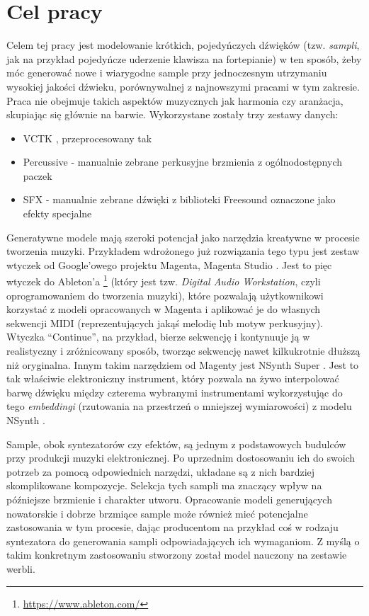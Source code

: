 \documentclass[magisterska]{pracamgr}
\renewcommand{\cite}{\citep}
\begin{document}
\section*{Cel pracy}

Celem tej pracy jest modelowanie krótkich, pojedyńczych dźwięków (tzw. \textit{sampli}, jak na przykład
pojedyńcze uderzenie klawisza na fortepianie) w ten sposób, żeby móc generować nowe i wiarygodne sample
przy jednoczesnym utrzymaniu wysokiej jakości dźwieku, porównywalnej z najnowszymi pracami w tym
zakresie. Praca nie obejmuje takich aspektów muzycznych jak harmonia czy aranżacja, skupiając się głównie
na barwie. Wykorzystane zostały trzy zestawy danych:
\begin{itemize}
    \setlength\itemsep{0em}
    \item VCTK \cite{Veaux2017CSTRVC}, przeprocesowany tak
    \item Percussive - manualnie zebrane perkusyjne brzmienia z ogólnodostępnych paczek
    \item SFX - manualnie zebrane dźwięki z biblioteki Freesound oznaczone jako efekty specjalne
\end{itemize}


Generatywne modele mają szeroki potencjał jako narzędzia kreatywne w procesie tworzenia muzyki. Przykładem wdrożonego już rozwiązania tego typu jest zestaw wtyczek od Google'owego projektu Magenta, Magenta Studio \cite{magentastudio}. Jest to pięc wtyczek do Ableton'a \footnote{\url{https://www.ableton.com/}} (który jest tzw. \textit{Digital Audio Workstation}, czyli oprogramowaniem do tworzenia muzyki), które pozwalają użytkownikowi korzystać z modeli opracowanych w Magenta i aplikować je do własnych sekwencji MIDI (reprezentujących jakąś melodię lub motyw perkusyjny). Wtyczka "`Continue"', na przykład, bierze sekwencję i kontynuuje ją w realistyczny i zróżnicowany sposób, tworząc sekwencję nawet kilkukrotnie dłuższą niż  oryginalna. Innym takim narzędziem od Magenty jest NSynth Super \cite{nsynthsuper}. Jest to tak właściwie elektroniczny instrument, który pozwala na żywo interpolować barwę dźwięku między czterema wybranymi instrumentami wykorzystując do tego \textit{embeddingi} (rzutowania na przestrzeń o mniejszej wymiarowości) z modelu NSynth \cite{nsynth2017}.

Sample, obok syntezatorów czy efektów, są jednym z podstawowych budulców przy produkcji muzyki elektronicznej. Po uprzednim dostosowaniu ich do swoich potrzeb za pomocą odpowiednich narzędzi, układane są z nich bardziej skomplikowane kompozycje. Selekcja tych sampli ma znaczący wpływ na późniejsze brzmienie i charakter utworu. Opracowanie modeli generujących nowatorskie i dobrze brzmiące sample może również mieć potencjalne zastosowania w tym procesie, dając producentom na przykład coś w rodzaju syntezatora do generowania sampli odpowiadających ich wymaganiom. Z myślą o takim konkretnym zastosowaniu stworzony został model nauczony na zestawie werbli.
\end{document}

